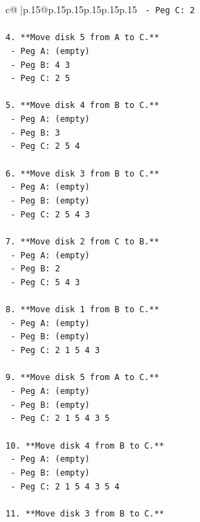 \documentclass{article}
\begin{document}
{\begin{supertabular}{c@{$\;$}|p{.15\linewidth}@{}p{.15\linewidth}p{.15\linewidth}p{.15\linewidth}p{.15\linewidth}p{.15\linewidth}}
{{{\texttt{   {-} Peg C: 2} \\
\\ 
\texttt{4. **Move disk 5 from A to C.**} \\
\texttt{   {-} Peg A: (empty)} \\
\texttt{   {-} Peg B: 4 3} \\
\texttt{   {-} Peg C: 2 5} \\
\\ 
\texttt{5. **Move disk 4 from B to C.**} \\
\texttt{   {-} Peg A: (empty)} \\
\texttt{   {-} Peg B: 3} \\
\texttt{   {-} Peg C: 2 5 4} \\
\\ 
\texttt{6. **Move disk 3 from B to C.**} \\
\texttt{   {-} Peg A: (empty)} \\
\texttt{   {-} Peg B: (empty)} \\
\texttt{   {-} Peg C: 2 5 4 3} \\
\\ 
\texttt{7. **Move disk 2 from C to B.**} \\
\texttt{   {-} Peg A: (empty)} \\
\texttt{   {-} Peg B: 2} \\
\texttt{   {-} Peg C: 5 4 3} \\
\\ 
\texttt{8. **Move disk 1 from B to C.**} \\
\texttt{   {-} Peg A: (empty)} \\
\texttt{   {-} Peg B: (empty)} \\
\texttt{   {-} Peg C: 2 1 5 4 3} \\
\\ 
\texttt{9. **Move disk 5 from A to C.**} \\
\texttt{   {-} Peg A: (empty)} \\
\texttt{   {-} Peg B: (empty)} \\
\texttt{   {-} Peg C: 2 1 5 4 3 5} \\
\\ 
\texttt{10. **Move disk 4 from B to C.**} \\
\texttt{    {-} Peg A: (empty)} \\
\texttt{    {-} Peg B: (empty)} \\
\texttt{    {-} Peg C: 2 1 5 4 3 5 4} \\
\\ 
\texttt{11. **Move disk 3 from B to C.**} \\
}}}
\end{supertabular}}
\end{document}
